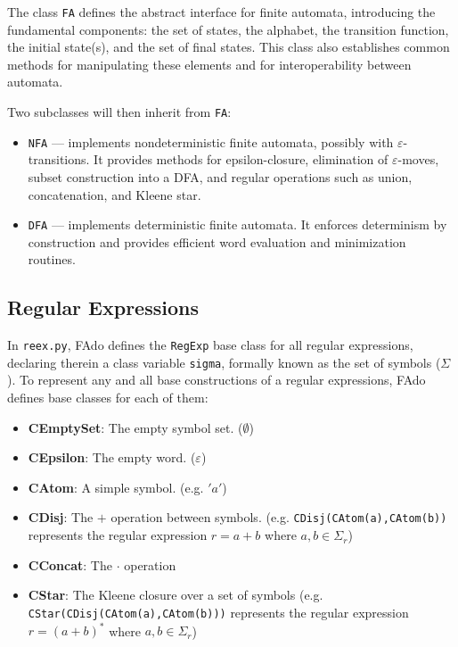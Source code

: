 


The class \texttt{FA} defines the abstract interface for finite automata, introducing the fundamental components: the set of states, the alphabet, the transition function, the initial state(s), and the set of final states. This class also establishes common methods for manipulating these elements and for interoperability between automata.

Two subclasses will then inherit from \texttt{FA}:
\begin{itemize}
	\item \texttt{NFA} --- implements nondeterministic finite automata, possibly with $\varepsilon$-transitions. It provides methods for epsilon-closure, elimination of $\varepsilon$-moves, subset construction into a DFA, and regular operations such as union, concatenation, and Kleene star.
	\item \texttt{DFA} --- implements deterministic finite automata. It enforces determinism by construction and provides efficient word evaluation and minimization routines.
\end{itemize}

\subsection{Regular Expressions}
In \texttt{reex.py}, FAdo defines the \texttt{RegExp} base class for all regular expressions, declaring therein a class variable \texttt{sigma}, formally known as the set of symbols ($\Sigma$).
To represent any and all base constructions of a regular expressions, FAdo defines base classes for each of them:
\begin{itemize}
    \item \textbf{CEmptySet}: The empty symbol set. ($\emptyset$)
    \item \textbf{CEpsilon}: The empty word. ($\varepsilon$)
    \item \textbf{CAtom}: A simple symbol. (e.g. $'a'$)
    \item \textbf{CDisj}: The $+$ operation between symbols. (e.g. \texttt{CDisj(CAtom(a),CAtom(b))} represents the regular expression $r=a+b$ where $a,b \in \Sigma_r$)
    \item \textbf{CConcat}: The $\cdot$ operation 
    \item \textbf{CStar}: The Kleene closure over a set of symbols (e.g. \texttt{CStar(CDisj(CAtom(a),CAtom(b)))} represents the regular expression $r=(a+b)^*$ where $a,b \in \Sigma_r$)

\end{itemize}

